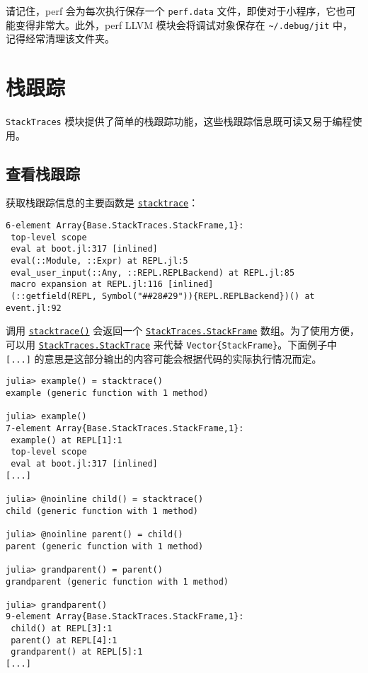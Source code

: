 请记住，perf 会为每次执行保存一个 \texttt{perf.data} 文件，即使对于小程序，它也可能变得非常大。此外，perf LLVM 模块会将调试对象保存在 \texttt{{\textasciitilde}/.debug/jit} 中，记得经常清理该文件夹。



\hypertarget{5468549229850022418}{}


\chapter{栈跟踪}



\texttt{StackTraces} 模块提供了简单的栈跟踪功能，这些栈跟踪信息既可读又易于编程使用。



\hypertarget{18224694583461024319}{}


\section{查看栈跟踪}



获取栈跟踪信息的主要函数是 \hyperlink{11964270650763140298}{\texttt{stacktrace}}：




\begin{verbatim}
6-element Array{Base.StackTraces.StackFrame,1}:
 top-level scope
 eval at boot.jl:317 [inlined]
 eval(::Module, ::Expr) at REPL.jl:5
 eval_user_input(::Any, ::REPL.REPLBackend) at REPL.jl:85
 macro expansion at REPL.jl:116 [inlined]
 (::getfield(REPL, Symbol("##28#29")){REPL.REPLBackend})() at event.jl:92
\end{verbatim}



调用 \hyperlink{11964270650763140298}{\texttt{stacktrace()}} 会返回一个 \hyperlink{16824886840215699957}{\texttt{StackTraces.StackFrame}} 数组。为了使用方便，可以用 \hyperlink{12289172590874430030}{\texttt{StackTraces.StackTrace}} 来代替 \texttt{Vector\{StackFrame\}}。下面例子中 \texttt{[...]} 的意思是这部分输出的内容可能会根据代码的实际执行情况而定。




\begin{verbatim}
julia> example() = stacktrace()
example (generic function with 1 method)

julia> example()
7-element Array{Base.StackTraces.StackFrame,1}:
 example() at REPL[1]:1
 top-level scope
 eval at boot.jl:317 [inlined]
[...]

julia> @noinline child() = stacktrace()
child (generic function with 1 method)

julia> @noinline parent() = child()
parent (generic function with 1 method)

julia> grandparent() = parent()
grandparent (generic function with 1 method)

julia> grandparent()
9-element Array{Base.StackTraces.StackFrame,1}:
 child() at REPL[3]:1
 parent() at REPL[4]:1
 grandparent() at REPL[5]:1
[...]
\end{verbatim}



